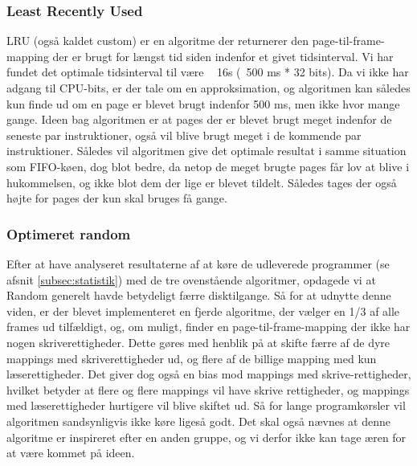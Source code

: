 	\subsubsection{Least Recently Used}
	LRU (også kaldet custom) er en algoritme der returnerer den page-til-frame-mapping der er brugt for længst tid siden indenfor et givet tidsinterval.  Vi har fundet det optimale tidsinterval til være ~ 16s (~500 ms * 32 bits). Da vi ikke har adgang til CPU-bits, er der tale om en approksimation, og algoritmen kan således kun finde ud om en page er blevet brugt indenfor 500 ms, men ikke hvor mange gange. Ideen bag algoritmen er at pages der er blevet brugt meget indenfor de seneste par instruktioner, også vil blive brugt meget i de kommende par instruktioner. Således vil algoritmen give det optimale resultat i samme situation som FIFO-køen, dog blot bedre, da netop de meget brugte pages får lov at blive i hukommelsen, og ikke blot dem der lige er blevet tildelt. Således tages der også højte for pages der kun skal bruges få gange.
	\subsubsection{Optimeret random}
	Efter at have analyseret resultaterne af at køre de udleverede programmer (se afsnit \ref{subsec:statistik}) med de tre ovenstående algoritmer, opdagede vi at Random generelt havde betydeligt færre disktilgange. Så for at udnytte denne viden, er der blevet implementeret en fjerde algoritme, der vælger en 1/3 af alle frames ud tilfældigt, og, om muligt, finder en page-til-frame-mapping der ikke har nogen skriverettigheder. Dette gøres med henblik på at skifte færre af de dyre mappings med skriverettigheder ud, og flere af de billige mapping med kun læserettigheder. Det giver dog også en bias mod mappings med skrive-rettigheder, hvilket betyder at flere og flere mappings vil have skrive rettigheder, og mappings med læserettigheder hurtigere vil blive skiftet ud. Så for lange programkørsler vil algoritmen sandsynligvis ikke køre ligeså godt. Det skal også nævnes at denne algoritme er inspireret efter en anden gruppe, og vi derfor ikke kan tage æren for at være kommet på ideen. 